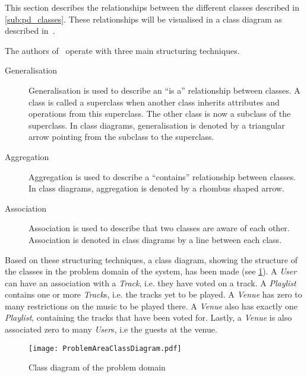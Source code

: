 This section describes the relationships between the different classes
described in \cref{sub:pd_classes}. These relationships will be
visualised in a class diagram as described
in~\cite{mathiassen2001objektorienteret}.

The authors of~\cite{mathiassen2001objektorienteret} operate with three
main structuring techniques.

\begin{description}
\item[Generalisation] Generalisation is used to describe an \enquote{is a}
  relationship between classes. A class is called a
  superclass when another class inherits attributes and operations
  from this superclass. The other class is now a subclass of the
  superclass. In class diagrams, generalisation is denoted by a
  triangular arrow pointing from the subclass to the superclass.
\item[Aggregation] Aggregation is used to describe a
  \enquote{contains} relationship between classes. In class diagrams,
  aggregation is denoted by a rhombus shaped arrow.
\item[Association] Association is used to describe that two classes
  are aware of each other. Association is denoted in class diagrams by
  a line between each class.
\end{description} 

Based on these structuring techniques, a class diagram, showing the structure of the classes in the problem domain of the system, has been made (see \cref{fig:pd_structure}). A \textit{User} can have an association with a \textit{Track}, i.e. they have voted on a track. A \textit{Playlist} contains one or more \textit{Track}s, i.e. the tracks yet to be played. A \textit{Venue} has zero to many restrictions on the music to be played there. A \textit{Venue} also has exactly one \textit{Playlist}, containing the tracks that have been voted for. Lastly, a \textit{Venue} is also associated zero to many \textit{User}s, i.e the guests at the venue.

\begin{figure}[htbp]
  \centering
  \texttt{[image: ProblemAreaClassDiagram.pdf]}
  \caption{Class diagram of the problem domain}\label{fig:pd_structure}
\end{figure}
